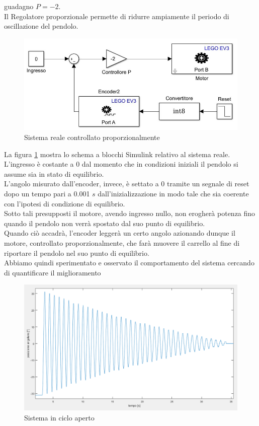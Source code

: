 guadagno $P=-2$.\\
Il Regolatore proporzionale permette di ridurre ampiamente il periodo di oscillazione del pendolo.\\
\begin{figure}[ht]
	\centering
	\includegraphics[width=\textwidth]{pendoloReale.jpg}
	\caption{Sistema reale controllato proporzionalmente}
	\label{pendoloReale}
\end{figure}
\newpage
La figura \ref{pendoloReale} mostra lo schema a blocchi Simulink relativo al sistema reale.\\
L'ingresso è costante a 0 dal momento che in condizioni iniziali il pendolo si assume sia in stato di equilibrio.\\
L'angolo misurato dall'encoder, invece, è settato a 0 tramite un segnale di reset dopo un tempo pari a 0.001 $s$ dall'inizializzazione in modo tale che sia coerente con l'ipotesi di condizione di equilibrio.\\
Sotto tali presupposti il motore, avendo ingresso nullo, non erogherà potenza fino quando il pendolo non verrà spostato dal suo punto di equilibrio.\\
Quando ciò accadrà, l'encoder leggerà un certo angolo azionando dunque il motore, controllato proporzionalmente, che farà muovere il carrello al fine di riportare il pendolo nel suo punto di equilibrio.\\
Abbiamo quindi sperimentato e osservato il comportamento del sistema cercando di quantificare il miglioramento 
\begin{figure}[ht]
	\centering
	\includegraphics[scale=0.402]{oscillOL.PNG}
	\caption{Sistema in ciclo aperto}
	\label{oscillOL}
\end{figure} 
